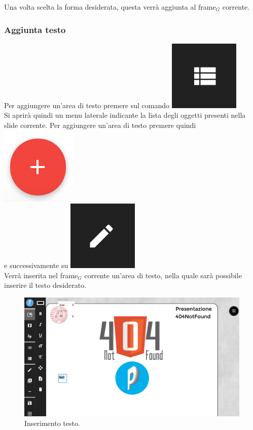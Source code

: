 Una volta scelta la forma desiderata, questa verrà aggiunta al frame$_G$ corrente.

\newpage
\subsubsection{Aggiunta testo}
Per aggiungere un'area di testo premere sul comando \includegraphics[scale=0.4]{img/slides_object.png}\\
Si aprirà quindi un menu laterale indicante la lista degli oggetti presenti nella slide corrente. Per aggiungere un'area di testo premere quindi \includegraphics[scale=0.4]{img/add.png}\\ e successivamente su \includegraphics[scale=0.4]{img/add_text.png}\\
Verrà inserita nel frame$_G$ corrente un'area di testo, nella quale sarà possibile inserire il testo desiderato.

\begin{figure}[!h]
\begin{center}
\includegraphics[scale=0.35]{img/screen_add_text.png}
\caption{Inserimento testo.}
\end{center}
\end{figure}

